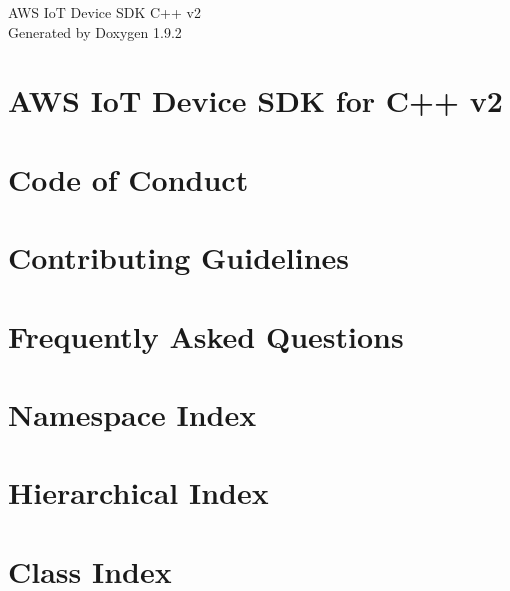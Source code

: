 \documentclass[twoside]{book}
\newcommand{\+}{\discretionary{\mbox{\scriptsize$\hookleftarrow$}}{}{}}
\newcommand{\clearemptydoublepage}{%
    \newpage{\pagestyle{empty}\cleardoublepage}%
  }
\begin{document}
  \raggedbottom
    \hypersetup{pageanchor=false,
                bookmarksnumbered=true,
                pdfencoding=unicode
               }
  \begin{titlepage}
  \vspace*{7cm}
  \begin{center}%
  {\Large AWS Io\+T Device SDK C++ v2}\\
  \vspace*{1cm}
  {\large Generated by Doxygen 1.9.2}\\
  \end{center}
  \end{titlepage}
  \clearemptydoublepage
  \tableofcontents
  \clearemptydoublepage
  \hypersetup{pageanchor=true}
\chapter{AWS IoT Device SDK for C++ v2}
\label{index}\hypertarget{index}{}
\chapter{Code of Conduct}
\label{md__c_o_d_e__o_f__c_o_n_d_u_c_t}

\chapter{Contributing Guidelines}
\label{md__c_o_n_t_r_i_b_u_t_i_n_g}

\chapter{Frequently Asked Questions}
\label{md__f_a_q}

\chapter{Namespace Index}

\chapter{Hierarchical Index}

\chapter{Class Index}

\end{document}
